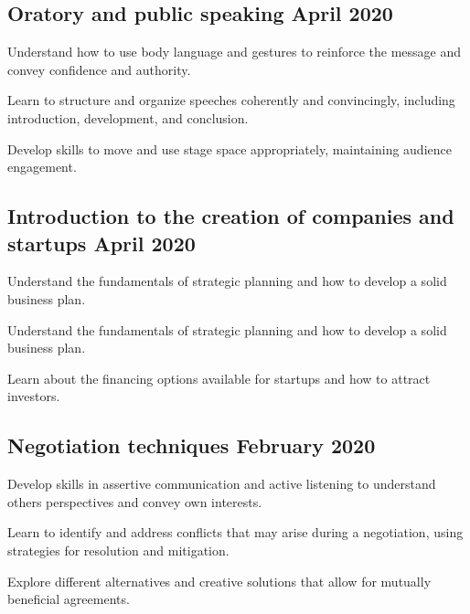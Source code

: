 \subsection{Oratory and public speaking \hfill April 2020}
\begin{zitemize}
\item Understand how to use body language and gestures to reinforce the message and convey confidence and authority.
\item Learn to structure and organize speeches coherently and convincingly, including introduction, development, and conclusion.
\item Develop skills to move and use stage space appropriately, maintaining audience engagement.
\end{zitemize}

\subsection{Introduction to the creation of companies and startups \hfill April 2020}
\begin{zitemize}
\item Understand the fundamentals of strategic planning and how to develop a solid business plan.
\item Understand the fundamentals of strategic planning and how to develop a solid business plan.
\item Learn about the financing options available for startups and how to attract investors.
\end{zitemize}

\subsection{Negotiation techniques \hfill February 2020}
\begin{zitemize}
\item Develop skills in assertive communication and active listening to understand others perspectives and convey own interests.
\item Learn to identify and address conflicts that may arise during a negotiation, using strategies for resolution and mitigation.
\item Explore different alternatives and creative solutions that allow for mutually beneficial agreements.
\end{zitemize}

